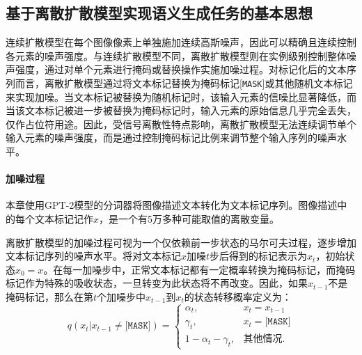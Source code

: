 \subsection{基于离散扩散模型实现语义生成任务的基本思想}
\label{sec:ddcap-method}
连续扩散模型在每个图像像素上单独施加连续高斯噪声，因此可以精确且连续控制各元素的噪声强度。与连续扩散模型不同，离散扩散模型则在实例级别控制整体噪声强度，通过对单个元素进行掩码或替换操作实施加噪过程。对标记化后的文本序列而言，离散扩散模型通过将文本标记替换为掩码标记[\texttt{MASK}]或其他随机文本标记来实现加噪。当文本标记被替换为随机标记时，该输入元素的信噪比显著降低，而当该文本标记被进一步被替换为掩码标记时，输入元素的原始信息几乎完全丢失，仅作占位符用途。因此，受信号离散性特点影响，离散扩散模型无法连续调节单个输入元素的噪声强度，而是通过控制掩码标记比例来调节整个输入序列的噪声水平。


\paragraph{加噪过程} 本章使用GPT-2模型的分词器\cite{gpt2}将图像描述文本转化为文本标记序列。图像描述中的每个文本标记记作$x$，是一个有5万多种可能取值的离散变量。

离散扩散模型的加噪过程可视为一个仅依赖前一步状态的马尔可夫过程，逐步增加文本标记序列的噪声水平。将对文本标记$x$加噪$t$步后得到的标记表示为$x_{t}$，初始状态$x_0=x$。在每一加噪步中，正常文本标记都有一定概率转换为掩码标记，而掩码标记作为特殊的吸收状态，一旦转变为此状态将不再改变。因此，如果$x_{t-1}$不是掩码标记，那么在第$t$个加噪步中$x_{t-1}$到$x_t$的状态转移概率定义为：
\begin{equation}
    q(x_t | x_{t - 1}\neq\texttt{[MASK]}) = 
    \begin{cases}
    \alpha_t, & x_t = x_{t - 1} \\
    \gamma_t, & x_t = \texttt{[MASK]} \\
    1 - \alpha_t - \gamma_t, & \text{其他情况}.
    \end{cases}
    \label{eq:iclip-q-nonmask}
\end{equation}

